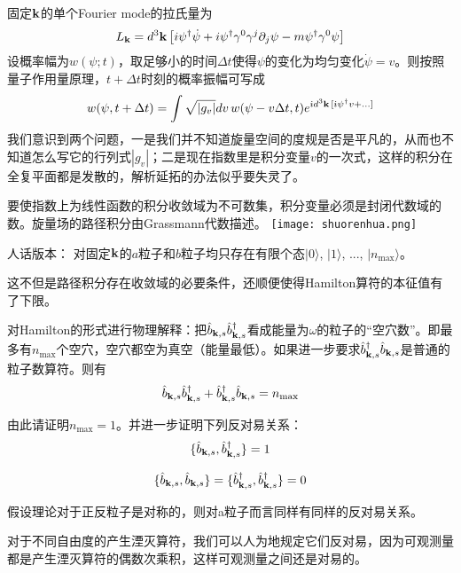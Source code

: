 \documentclass[CJK]{beamer}
\begin{document}
\begin{frame}
\bch
固定${\mathbf{k}}$的单个Fourier mode的拉氏量为
$$L_{\mathbf{k}} = d^3{\mathbf{k}} \left[ i\psi^\dagger\dot\psi + i\psi^\dagger\gamma^0\gamma^j\partial_j\psi - m \psi^\dagger\gamma^0 \psi \right]$$
设概率幅为$w(\psi;t)$，取足够小的时间$\Delta t$使得$\psi$的变化为均匀变化$\dot\psi = v$。则按照量子作用量原理，$t+\Delta t$时刻的概率振幅可写成
$$w(\psi, t+\Delta t) = \int \sqrt{|g_v|}dv\, w(\psi - v \Delta t, t) e^{{\dot{\imath}} d^3{\mathbf{k}}\,[{\dot{\imath}}\psi^\dagger v + \ldots]}$$
我们意识到两个问题，一是我们并不知道旋量空间的度规是否是平凡的，从而也不知道怎么写它的行列式$|g_v|$；二是现在指数里是积分变量$v$的一次式，这样的积分在全复平面都是发散的，解析延拓的办法似乎要失灵了。
\ech
\end{frame}


\begin{frame}
\bch
要使指数上为线性函数的积分收敛域为不可数集，积分变量必须是封闭代数域的数。旋量场的路径积分由Grassmann代数描述。
\texttt{[image: shuorenhua.png]}

\ech
\end{frame}



\begin{frame}
\bch
人话版本： 对固定${\mathbf{k}}$的$a$粒子和$b$粒子均只存在有限个态$|0\rangle$, $|1\rangle$, ..., $|n_{\max}\rangle$。

\skipline
\skipline
\skipline
这不但是路径积分存在收敛域的必要条件，还顺便使得Hamilton算符的本征值有了下限。
\ech
\end{frame}


\begin{frame}
\bch
对Hamilton的形式进行物理解释：把${\hat{b}}_{{\mathbf{k}},s}{\hat{b}^\dagger}_{{\mathbf{k}},s}$看成能量为$\omega$的粒子的“空穴数”。即最多有$n_{\max}$个空穴，空穴都空为真空（能量最低）。如果进一步要求${\hat{b}^\dagger}_{{\mathbf{k}},s}{\hat{b}}_{{\mathbf{k}},s}$是普通的粒子数算符。则有
$${\hat{b}}_{{\mathbf{k}},s}{\hat{b}^\dagger}_{{\mathbf{k}},s} + {\hat{b}^\dagger}_{{\mathbf{k}},s}{\hat{b}}_{{\mathbf{k}},s} = n_{\max}$$ 

由此请证明$n_{\max} = 1$。并进一步证明下列反对易关系：
$$\{{\hat{b}}_{{\mathbf{k}},s},{\hat{b}^\dagger}_{{\mathbf{k}},s}\} = 1$$

$$\{{\hat{b}}_{{\mathbf{k}},s}, {\hat{b}}_{{\mathbf{k}},s} \} = \{ {\hat{b}^\dagger}_{{\mathbf{k}},s}, {\hat{b}^\dagger}_{{\mathbf{k}},s}\} = 0$$

假设理论对于正反粒子是对称的，则对a粒子而言同样有同样的反对易关系。
\ech
\end{frame}


\begin{frame}
\bch
对于不同自由度的产生湮灭算符，我们可以人为地规定它们反对易，因为可观测量都是产生湮灭算符的偶数次乘积，这样可观测量之间还是对易的。
\ech
\end{frame}
\end{document}
